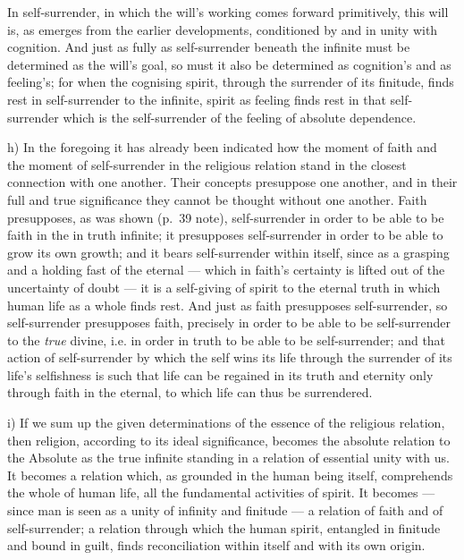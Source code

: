 \documentclass[12pt,a4paper]{book}
\begin{document}
In self-surrender, in which the will's working comes forward primitively, this
will is, as emerges from the earlier developments, conditioned by and in unity
with cognition. And just as fully as self-surrender beneath the infinite must
be determined as the will's goal, so must it also be determined as cognition's
and as feeling's; for when the cognising spirit, through the surrender of its
finitude, finds rest in self-surrender to the infinite, spirit as feeling
finds rest in that self-surrender which is the self-surrender of the feeling
of absolute dependence.

h) In the foregoing it has already been indicated how
the moment of faith and the moment of self-surrender in the religious relation
stand in the closest connection with one another. Their concepts presuppose
one another, and in their full and true significance they cannot be thought
without one another. Faith presupposes, as was shown (p.\ 39 note),
self-surrender in order to be able to be faith in the in truth infinite; it
presupposes self-surrender in order to be able to grow its own growth; and it
bears self-surrender within itself, since as a grasping and a holding fast of
the eternal --- which in faith's certainty is lifted out of the uncertainty of
doubt --- it is a self-giving of spirit to the eternal truth in which human
life as a whole finds rest. And just as faith presupposes self-surrender, so
self-surrender presupposes faith, precisely in order to be able to be
self-surrender to the \emph{true} divine, i.e. in order in truth to be able to
be self-surrender; and that action of self-surrender by which the self wins
its life through the surrender of its life's selfishness is such that life can
be regained in its truth and eternity only through faith in the eternal, to
which life can thus be surrendered.

i) If we sum up the given determinations of the essence of the religious
relation, then religion, according to its ideal significance, becomes the
absolute relation to the Absolute as the true infinite standing in a relation
of essential unity with us. It becomes a relation which, as grounded in the
human being itself, comprehends the whole of human life, all the fundamental
activities of spirit. It becomes --- since man is seen as a unity of infinity
and finitude --- a relation of faith and of self-surrender; a relation through
which the human spirit, entangled in finitude and bound in guilt, finds
reconciliation within itself and with its own origin.
\end{document}
